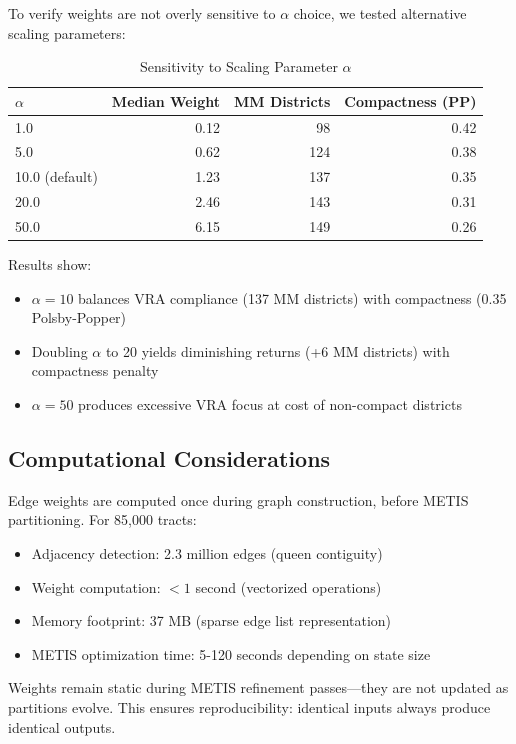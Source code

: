 To verify weights are not overly sensitive to $\alpha$ choice, we tested alternative scaling parameters:

\begin{table}[h]
\centering
\caption{Sensitivity to Scaling Parameter $\alpha$}
\begin{tabular}{lrrr}
\toprule
\textbf{$\alpha$} & \textbf{Median Weight} & \textbf{MM Districts} & \textbf{Compactness (PP)} \\
\midrule
1.0 & 0.12 & 98 & 0.42 \\
5.0 & 0.62 & 124 & 0.38 \\
10.0 (default) & 1.23 & 137 & 0.35 \\
20.0 & 2.46 & 143 & 0.31 \\
50.0 & 6.15 & 149 & 0.26 \\
\bottomrule
\end{tabular}
\label{tab:alpha-sensitivity}
\end{table}

Results show:
\begin{itemize}
\item $\alpha = 10$ balances VRA compliance (137 MM districts) with compactness (0.35 Polsby-Popper)
\item Doubling $\alpha$ to 20 yields diminishing returns (+6 MM districts) with compactness penalty
\item $\alpha = 50$ produces excessive VRA focus at cost of non-compact districts
\end{itemize}

\subsection{Computational Considerations}

Edge weights are computed once during graph construction, before METIS partitioning. For 85,000 tracts:
\begin{itemize}
\item Adjacency detection: 2.3 million edges (queen contiguity)
\item Weight computation: $< 1$ second (vectorized operations)
\item Memory footprint: 37 MB (sparse edge list representation)
\item METIS optimization time: 5-120 seconds depending on state size
\end{itemize}

Weights remain static during METIS refinement passes---they are not updated as partitions evolve. This ensures reproducibility: identical inputs always produce identical outputs.

